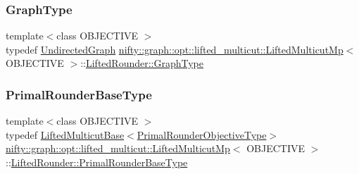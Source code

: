 \subsubsection{\texorpdfstring{Graph\+Type}{GraphType}}
{\footnotesize\ttfamily template$<$class O\+B\+J\+E\+C\+T\+I\+VE $>$ \\
typedef \hyperlink{classnifty_1_1graph_1_1UndirectedGraph}{Undirected\+Graph} \hyperlink{classnifty_1_1graph_1_1opt_1_1lifted__multicut_1_1LiftedMulticutMp}{nifty\+::graph\+::opt\+::lifted\+\_\+multicut\+::\+Lifted\+Multicut\+Mp}$<$ O\+B\+J\+E\+C\+T\+I\+VE $>$\+::\hyperlink{structnifty_1_1graph_1_1opt_1_1lifted__multicut_1_1LiftedMulticutMp_1_1LiftedRounder_ab554fdcb105127764221d744665a12fc}{Lifted\+Rounder\+::\+Graph\+Type}}

\mbox{\label{structnifty_1_1graph_1_1opt_1_1lifted__multicut_1_1LiftedMulticutMp_1_1LiftedRounder_a4f36e999999e10b1a2c4a78d724ee847}} 
\subsubsection{\texorpdfstring{Primal\+Rounder\+Base\+Type}{PrimalRounderBaseType}}
{\footnotesize\ttfamily template$<$class O\+B\+J\+E\+C\+T\+I\+VE $>$ \\
typedef \hyperlink{classnifty_1_1graph_1_1opt_1_1lifted__multicut_1_1LiftedMulticutBase}{Lifted\+Multicut\+Base}$<$\hyperlink{structnifty_1_1graph_1_1opt_1_1lifted__multicut_1_1LiftedMulticutMp_1_1LiftedRounder_aba77dfcceab7f0a4a92e6875c9807605}{Primal\+Rounder\+Objective\+Type}$>$ \hyperlink{classnifty_1_1graph_1_1opt_1_1lifted__multicut_1_1LiftedMulticutMp}{nifty\+::graph\+::opt\+::lifted\+\_\+multicut\+::\+Lifted\+Multicut\+Mp}$<$ O\+B\+J\+E\+C\+T\+I\+VE $>$\+::\hyperlink{structnifty_1_1graph_1_1opt_1_1lifted__multicut_1_1LiftedMulticutMp_1_1LiftedRounder_a4f36e999999e10b1a2c4a78d724ee847}{Lifted\+Rounder\+::\+Primal\+Rounder\+Base\+Type}}


